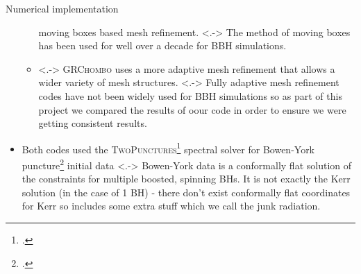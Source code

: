 \documentclass[smaller,aspectratio=169]{beamer}
\begin{document}
\begin{frame}{Numerical implementation}
\begin{itemize}
\begin{itemize}
                \alert{moving boxes} based mesh refinement.
            \note[item]<.->{\scriptsize
                The method of moving boxes has been used for well over a decade 
                for BBH simulations.}
            \item<.->
                \textsc{GRChombo} uses a more \alert{adaptive} mesh refinement 
                that allows a wider variety of mesh structures.
            \note[item]<.->{\scriptsize
                Fully adaptive mesh refinement codes have not been widely used
                for BBH simulations so as part of this project we compared
                the results of oour code in order to ensure we were getting
                consistent results.}
        \end{itemize}
        \item<+->
            Both codes used the \textsc{TwoPunctures}\footcite{Ansorg:2004ds} 
            spectral solver for \alert{Bowen-York 
            puncture}\footcite{Bowen:1980yu} initial data
        \note[item]<.->{\scriptsize
            Bowen-York data is a conformally flat solution of the constraints 
            for multiple
            boosted, spinning BHs. It is not exactly the Kerr solution (in the 
            case of 1 BH) - there don't exist conformally flat coordinates 
            for Kerr so includes some extra stuff which we call the junk 
            radiation.}
    \end{itemize}
    \vspace{0.5 em}
\end{frame}
\end{document}
